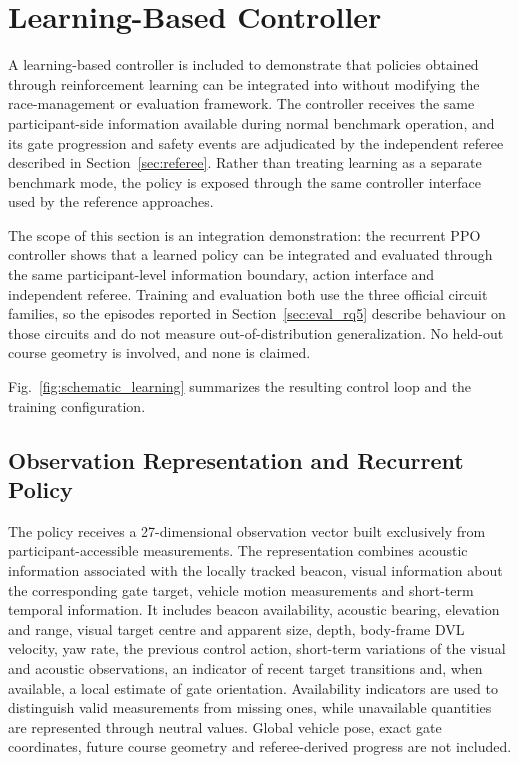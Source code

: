 \section{Learning-Based Controller}
\label{sec:learning}

A learning-based controller is included to demonstrate that policies obtained
through reinforcement learning can be integrated into \mra{} without modifying
the race-management or evaluation framework. The controller receives the same
participant-side information available during normal benchmark operation, and its
gate progression and safety events are adjudicated by the independent referee
described in Section~\ref{sec:referee}.
Rather than treating learning as a separate benchmark mode, the policy is exposed
through the same controller interface used by the reference approaches.

The scope of this section is an integration demonstration: the recurrent PPO
controller shows that a learned policy can be integrated and evaluated through the
same participant-level information boundary, action interface and independent
referee. Training and evaluation both use the three official circuit families, so
the episodes reported in Section~\ref{sec:eval_rq5} describe behaviour on those
circuits and do not measure out-of-distribution generalization. No held-out course
geometry is involved, and none is claimed.

Fig.~\ref{fig:schematic_learning} summarizes the resulting control loop and the
training configuration.


\subsection{Observation Representation and Recurrent Policy}
\label{sec:learning_obs}

The policy receives a 27-dimensional observation vector built exclusively from
participant-accessible measurements. The representation combines acoustic
information associated with the locally tracked beacon, visual information about
the corresponding gate target, vehicle motion measurements and short-term
temporal information. It includes beacon availability, acoustic bearing,
elevation and range, visual target centre and apparent size, depth, body-frame
DVL velocity, yaw rate, the previous control action, short-term variations of the
visual and acoustic observations, an indicator of recent target transitions and,
when available, a local estimate of gate orientation. Availability indicators
are used to distinguish valid measurements from missing ones, while unavailable
quantities are represented through neutral values. Global vehicle pose, exact
gate coordinates, future course geometry and referee-derived progress are not
included.


